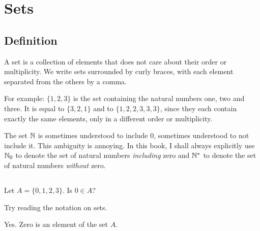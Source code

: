 \chapter{Sets}\label{ch:sets}
\section{Definition}
\begin{definition}
  A set is a collection of elements that does not care about their order or
  multiplicity. We write sets surrounded by curly braces, with each element
  separated from the others by a comma.
\end{definition}
\begin{example}
  For example: \(\{1, 2, 3\}\) is the set
  containing the natural numbers one, two and three. It is equal to
  \(\{3,2,1\}\) and to \(\{1,2,2,3,3,3\}\), since they each contain exactly the
  same elements, only in a different order or multiplicity.
\end{example}

The set \(\mathbb{N}\) is sometimes understood to include \(0\), sometimes understood
to not include it. This ambiguity is annoying.
In this book, I shall always explicitly use \(\mathbb{N}_{0}\) to denote the set of
natural numbers \emph{including} zero and \(\mathbb{N}^{*}\) to denote the set of
natural numbers \emph{without} zero.

\section{\problemhead}
\begin{problem}
  Let \(A=\{0,1,2,3\}\). Is \(0 \in A\)?
  \begin{hint}
    Try reading the notation on sets.
  \end{hint}
  \begin{sol}
    Yes. Zero is an element of the set \(A\).
  \end{sol}
\end{problem}
